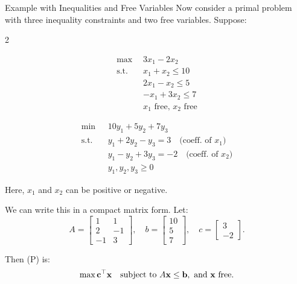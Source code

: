 \begin{example}{Example with Inequalities and Free Variables}{}
Now consider a primal problem with three inequality constraints and two free variables. Suppose:

\begin{multicols}{2}
\begin{tcolorbox}[title=Primal (P), colback=blue!5, colframe=blue!60!black, sharp corners=south]
\[
\begin{aligned}
\max\ & 3x_1 - 2x_2 \\
\text{s.t.} \quad 
& x_1 + x_2 \leq 10 \\
& 2x_1 - x_2 \leq 5 \\
& -x_1 + 3x_2 \leq 7 \\
& x_1 \text{ free, } x_2 \text{ free}
\end{aligned}
\]
\end{tcolorbox}

\columnbreak

\begin{tcolorbox}[title=Dual (D), colback=green!5, colframe=green!60!black, sharp corners=south]
\[
\begin{aligned}
\min\ & 10y_1 + 5y_2 + 7y_3 \\
\text{s.t.} \quad 
& y_1 + 2y_2 - y_3 = 3 \quad \text{(coeff. of } x_1) \\
& y_1 - y_2 + 3y_3 = -2 \quad \text{(coeff. of } x_2) \\
& y_1, y_2, y_3 \geq 0
\end{aligned}
\]
\end{tcolorbox}
\end{multicols}

Here, $x_1$ and $x_2$ can be positive or negative. 

We can write this in a compact matrix form. Let:
\[
A = \begin{bmatrix}
1 & 1 \\
2 & -1 \\
-1 & 3 
\end{bmatrix}, \quad b = \begin{bmatrix}
10 \\ 5 \\ 7
\end{bmatrix}, \quad c = \begin{bmatrix}
3 \\ -2
\end{bmatrix}.
\]

Then (P) is:
\[
\max \mathbf{c}^\top \mathbf{x} \quad \mbox{subject to } A \mathbf{x} \leq \mathbf{b}, \mbox{ and } \mathbf{x} \mbox{ free}.
\]


\end{example}

